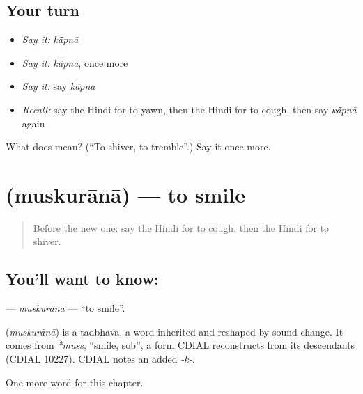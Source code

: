 \subsection*{Your turn}
\begin{itemize}
\raggedright
  \item \emph{Say it:} \emph{kā̃pnā}
  \item \emph{Say it:} \emph{kā̃pnā}, once more
  \item \emph{Say it:} say \emph{kā̃pnā}
  \item \emph{Recall:} say the Hindi for to yawn, then the Hindi for to cough, then say \emph{kā̃pnā} again
\end{itemize}

\begin{tcolorbox}[breakable,colback=teal!4,colframe=teal!35!black,title={Before you move on}]
What does  mean? (\textquotedblleft{}To shiver, to tremble\textquotedblright{}.) Say it once more.
\end{tcolorbox}
\section[\texorpdfstring{\hi{मुस्कुराना} (muskurānā)}{मुस्कुराना (muskurānā)}]{ (muskurānā) — to smile}

\label{lesson:HI-C232-muskurana}



\begin{quote}
Before the new one: say the Hindi for to cough, then the Hindi for to shiver.
\end{quote}

\subsection*{You'll want to know: }
\textbf{} — \emph{muskurānā} — \textquotedblleft{}to smile\textquotedblright{}.

\begin{cousinweb}
\textbf{} (\emph{muskurānā}) is a tadbhava, a word inherited and reshaped by sound change. It comes from \emph{*muss}, \textquotedblleft{}smile, sob\textquotedblright{}, a form CDIAL reconstructs from its descendants (CDIAL 10227). CDIAL notes an added \emph{-k-}.
\end{cousinweb}

\begin{grammarlens}[title={What you've built}]
One more word for this chapter.
\end{grammarlens}

